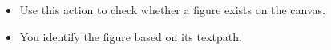
\begin{itemize}
\item Use this action to check whether a figure exists on the canvas. 
\item You identify the figure based on its textpath. 
\end{itemize}
